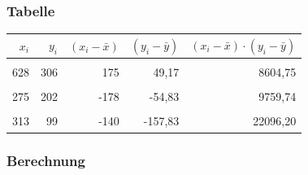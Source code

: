 \documentclass[
  11pt,
  ngerman,
  a4paper,
]{report}
\begin{document}
\hypertarget{tabelle}{%
\subsubsection{Tabelle}\label{tabelle}}

\begin{table}[H]
\centering
\begin{tabular}{rrrrr}
\toprule
\textbf{$x_i$} & \textbf{$y_i$} & \textbf{$(x_i-\bar{x})$} & \textbf{$(y_i-\bar{y})$} & \textbf{$(x_i-\bar{x})\cdot(y_i-\bar{y})$}\\
\midrule
\cellcolor{gray!6}{456} & \cellcolor{gray!6}{264} & \cellcolor{gray!6}{3} & \cellcolor{gray!6}{7,17} & \cellcolor{gray!6}{21,51}\\
628 & 306 & 175 & 49,17 & 8604,75\\
\cellcolor{gray!6}{497} & \cellcolor{gray!6}{348} & \cellcolor{gray!6}{44} & \cellcolor{gray!6}{91,17} & \cellcolor{gray!6}{4011,48}\\
275 & 202 & -178 & -54,83 & 9759,74\\
\cellcolor{gray!6}{549} & \cellcolor{gray!6}{322} & \cellcolor{gray!6}{96} & \cellcolor{gray!6}{65,17} & \cellcolor{gray!6}{6256,32}\\
313 & 99 & -140 & -157,83 & 22096,20\\
\bottomrule
\end{tabular}
\end{table}

\hypertarget{berechnung}{%
\subsubsection{Berechnung}\label{berechnung}}
\end{document}
